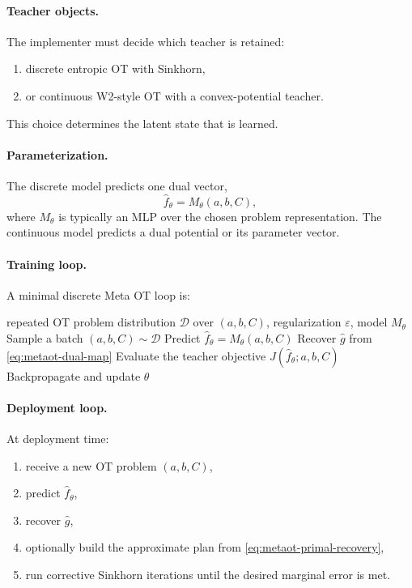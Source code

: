 \documentclass[11pt]{report}
\begin{document}
\paragraph{Teacher objects.}
The implementer must decide which teacher is retained:
\begin{enumerate}[label=(\roman*)]
  \item discrete entropic OT with Sinkhorn,
  \item or continuous W2-style OT with a convex-potential teacher.
\end{enumerate}
This choice determines the latent state that is learned.

\paragraph{Parameterization.}
The discrete model predicts one dual vector,
\begin{equation}
\widehat f_\theta = M_\theta(a,b,C),
\label{eq:metaot-mlp}
\end{equation}
where $M_\theta$ is typically an MLP over the chosen problem representation.  The
continuous model predicts a dual potential or its parameter vector.

\paragraph{Training loop.}
A minimal discrete Meta OT loop is:
\begin{algorithm}[ht]
\caption{Meta OT training loop}
\begin{algorithmic}[1]
\Require repeated OT problem distribution $\mathcal D$ over $(a,b,C)$, regularization $\varepsilon$, model $M_\theta$
  \State Sample a batch $(a,b,C)\sim\mathcal D$
  \State Predict $\widehat f_\theta=M_\theta(a,b,C)$
  \State Recover $\widehat g$ from \eqref{eq:metaot-dual-map}
  \State Evaluate the teacher objective $J(\widehat f_\theta;a,b,C)$
  \State Backpropagate and update $\theta$
\EndFor
\end{algorithmic}
\end{algorithm}

\paragraph{Deployment loop.}
At deployment time:
\begin{enumerate}[label=(\arabic*)]
  \item receive a new OT problem $(a,b,C)$,
  \item predict $\widehat f_\theta$,
  \item recover $\widehat g$,
  \item optionally build the approximate plan from \eqref{eq:metaot-primal-recovery},
  \item run corrective Sinkhorn iterations until the desired marginal error is met.
\end{enumerate}
\end{document}
